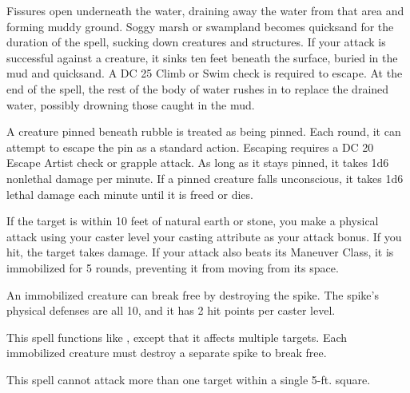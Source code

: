 \begin{spelleffect}
  \par {} Fissures open underneath the water, draining away the water from that area and forming muddy ground. Soggy marsh or swampland becomes quicksand for the duration of the spell, sucking down creatures and structures.  If your attack is successful against a creature, it sinks ten feet beneath the surface, buried in the mud and quicksand. A DC 25 Climb or Swim check is required to escape. At the end of the spell, the rest of the body of water rushes in to replace the drained water, possibly drowning those caught in the mud.
\end{spelleffect}
\begin{spellnotes}
    A creature pinned beneath rubble is treated as being pinned. Each round, it can attempt to escape the pin as a standard action. Escaping requires a DC 20 Escape Artist check or grapple attack. As long as it stays pinned, it takes 1d6 nonlethal damage per minute. If a pinned creature falls unconscious, it takes 1d6 lethal damage each minute until it is freed or dies.
\end{spellnotes}

\spellrng{\rngmed}
\begin{spelleffect}
    If the target is within 10 feet of natural earth or stone, you make a physical attack using your caster level \add your casting attribute as your attack bonus. If you hit, the target takes damage. If your attack also beats its Maneuver Class, it is immobilized for 5 rounds, preventing it from moving from its space.

    An immobilized creature can break free by destroying the spike. The spike's physical defenses are all 10, and it has 2 hit points per caster level.
\end{spelleffect}

\begin{spelleffect}
    This spell functions like , except that it affects multiple targets. Each immobilized creature must destroy a separate spike to break free. 
\end{spelleffect}
\begin{spellnotes}
    This spell cannot attack more than one target within a single 5-ft. square.
\end{spellnotes}

